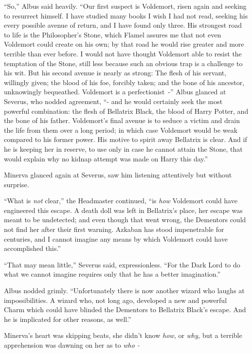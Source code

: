 ``So,'' Albus said heavily. ``Our first suspect is Voldemort, risen again and seeking to resurrect himself. I have studied many books I wish I had not read, seeking his every possible avenue of return, and I have found only three. His strongest road to life is the Philosopher's Stone, which Flamel assures me that not even Voldemort could create on his own; by that road he would rise greater and more terrible than ever before. I would not have thought Voldemort able to resist the temptation of the Stone, still less because such an obvious trap is a challenge to his wit. But his second avenue is nearly as strong: The flesh of his servant, willingly given; the blood of his foe, forcibly taken; and the bone of his ancestor, unknowingly bequeathed. Voldemort is a perfectionist~-'' Albus glanced at Severus, who nodded agreement, ``- and he would certainly seek the most powerful combination: the flesh of Bellatrix Black, the blood of Harry Potter, and the bone of his father. Voldemort's final avenue is to seduce a victim and drain the life from them over a long period; in which case Voldemort would be weak compared to his former power. His motive to spirit away Bellatrix is clear. And if he is keeping her in reserve, to use only in case he cannot attain the Stone, that would explain why no kidnap attempt was made on Harry this day.''

Minerva glanced again at Severus, saw him listening attentively but without surprise.

``What is \emph{not} clear,'' the Headmaster continued, ``is \emph{how} Voldemort could have engineered this escape. A death doll was left in Bellatrix's place, her escape was meant to be undetected; and even though that went wrong, the Dementors could not find her after their first warning. Azkaban has stood impenetrable for centuries, and I cannot imagine any means by which Voldemort could have accomplished this.''

``That may mean little,'' Severus said, expressionless. ``For the Dark Lord to do what we cannot imagine requires only that he has a better imagination.''

Albus nodded grimly. ``Unfortunately there is now another wizard who laughs at impossibilities. A wizard who, not long ago, developed a new and powerful Charm which could have blinded the Dementors to Bellatrix Black's escape. And he is implicated for other reasons, as well.''

Minerva's heart was skipping beats, she didn't know \emph{how,} or \emph{why,} but a terrible apprehension was dawning on her as to \emph{who -}

